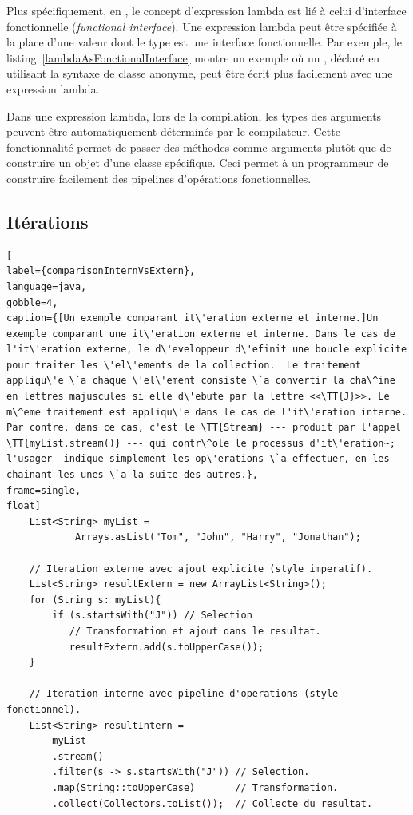 Plus sp\'ecifiquement, en , le concept d'expression lambda est li\'e \`a celui d'interface fonctionnelle (\emph{functional interface}). Une expression lambda peut \^etre sp\'ecifi\'ee \`a la place d'une valeur dont le type est une interface fonctionnelle. Par exemple, le listing~\ref{lambdaAsFonctionalInterface} montre un exemple o\`u un , d\'eclar\'e en utilisant la syntaxe de classe anonyme, peut \^etre \'ecrit plus facilement avec une expression lambda.

Dans une expression lambda, lors de la compilation, les types des arguments peuvent \^etre automatiquement d\'etermin\'es par le compilateur. Cette fonctionnalit\'e permet de passer des m\'ethodes comme arguments plut\^ot que de construire un objet d'une classe sp\'ecifique. Ceci permet \`a un programmeur de construire facilement des pipelines d'op\'erations fonctionnelles.


\subsection{It\'erations}


\begin{lstlisting}[
label={comparisonInternVsExtern},
language=java,
gobble=4,
caption={[Un exemple comparant it\'eration externe et interne.]Un exemple comparant une it\'eration externe et interne. Dans le cas de l'it\'eration externe, le d\'eveloppeur d\'efinit une boucle explicite pour traiter les \'el\'ements de la collection.  Le traitement appliqu\'e \`a chaque \'el\'ement consiste \`a convertir la cha\^ine en lettres majuscules si elle d\'ebute par la lettre <<\TT{J}>>. Le m\^eme traitement est appliqu\'e dans le cas de l'it\'eration interne. Par contre, dans ce cas, c'est le \TT{Stream} --- produit par l'appel \TT{myList.stream()} --- qui contr\^ole le processus d'it\'eration~; l'usager  indique simplement les op\'erations \`a effectuer, en les chainant les unes \`a la suite des autres.},
frame=single,
float]
    List<String> myList =
            Arrays.asList("Tom", "John", "Harry", "Jonathan");

    // Iteration externe avec ajout explicite (style imperatif).
    List<String> resultExtern = new ArrayList<String>();
    for (String s: myList){
        if (s.startsWith("J")) // Selection
           // Transformation et ajout dans le resultat.
           resultExtern.add(s.toUpperCase()); 
    }
        
    // Iteration interne avec pipeline d'operations (style fonctionnel).
    List<String> resultIntern = 
        myList
        .stream()
        .filter(s -> s.startsWith("J")) // Selection.
        .map(String::toUpperCase)       // Transformation.
        .collect(Collectors.toList());  // Collecte du resultat.
\end{lstlisting}


